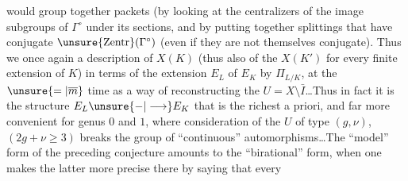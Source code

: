 would group together    packets (by looking at the centralizers of the image subgroups of $\Gamma^\circ$ under its sections,\deleted{)} and by putting together splittings that have conjugate $\unsure{\mathrm{Zentr}}(\Gamma^\circ)$ (even if they are not themselves conjugate). Thus we  once again a description of $X(K)$ (thus also of the $X(K')$ for every finite extension  of $K$) in terms of the extension $E_L$ of $E_K$ by $\Pi_{L/K}$, at the $\unsure{=|\overline m}$ time as a way of reconstructing the $U=X\setminus\bar I$\ldots Thus in fact it is the structure $E_L\unsure{-|\longrightarrow}E_K$ that is the richest a priori, and far more convenient for genus $0$ and $1$, where consideration of the $U$ of type $(g,\nu)$, $(2g+\nu\geq3)$ breaks the group of ``continuous'' automorphisms\ldots The ``model'' form of the preceding conjecture amounts to the ``birational'' form, when one makes the latter more precise there by saying that every
